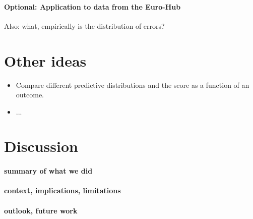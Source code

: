 \documentclass{article}
\begin{document}
\paragraph{Optional: Application to data from the Euro-Hub}
Also: what, empirically is the distribution of errors? 

\section{Other ideas}
\begin{itemize}
    \item Compare different predictive distributions and the score as a function of an outcome.
    \item ...
\end{itemize}




\section{Discussion}

\paragraph{summary of what we did}

\paragraph{context, implications, limitations}

\paragraph{outlook, future work}


 




\newpage
\end{document}
